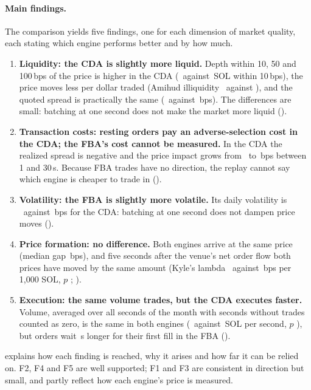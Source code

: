 \paragraph{Main findings.} The comparison yields five findings, one for
each dimension of market quality, each stating which engine performs
better and by how much.
\begin{enumerate}[label=\textbf{F\arabic*}]
  \item \textbf{Liquidity: the CDA is slightly more liquid.} Depth within
  10, 50 and 100\,bps of the price is higher in the CDA
  (\ResDepthWithinTenBpsCda\ against \ResDepthWithinTenBpsFba\,SOL within
  10\,bps), the price moves less per dollar traded (Amihud illiquidity
  \ResAmihudCda\ against \ResAmihudFba), and the quoted spread is
  practically the same (\ResQuotedSpreadCda\ against
  \ResQuotedSpreadFba\,bps). The differences are small: batching at one
  second does not make the market more liquid ().
  \item \textbf{Transaction costs: resting orders pay an adverse-selection
  cost in the CDA; the FBA's cost cannot be measured.} In the CDA the
  realized spread is negative and the price impact grows from
  \ResPriceImpactOneSCda\ to \ResPriceImpactThirtySCda\,bps between 1 and
  30\,s. Because FBA trades have no direction, the replay cannot say which
  engine is cheaper to trade in ().
  \item \textbf{Volatility: the FBA is slightly more volatile.} Its daily
  volatility is \ResMatchedVolFba\ against \ResMatchedVolCda\,bps for the
  CDA: batching at one second does not dampen price moves
  ().
  \item \textbf{Price formation: no difference.} Both engines arrive at
  the same price (median gap \PriceDiffMedianBps\,bps), and five seconds
  after the venue's net order flow both prices have moved by the same
  amount (Kyle's lambda \ResCommonFlowLambdaFiveSCda\ against
  \ResCommonFlowLambdaFiveSFba\,bps per 1{,}000 SOL, $p$
  \ResCommonFlowLambdaFiveSP; ).
  \item \textbf{Execution: the same volume trades, but the CDA executes
  faster.} Volume, averaged over all seconds of the month with seconds
  without trades counted as zero, is the same in both engines
  (\ResExecVolumeCda\ against
  \ResExecVolumeFba\,SOL per second, $p$ \ResExecVolumeP), but orders wait
  \ResTimeToExecDiff\,s longer for their first fill in the FBA
  ().
\end{enumerate}
 explains how each finding is reached, why
it arises and how far it can be relied on. F2, F4 and F5 are well
supported; F1 and F3 are consistent in direction but small, and partly
reflect how each engine's price is measured.


